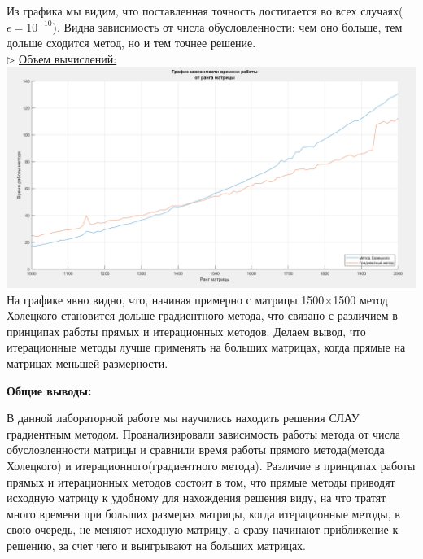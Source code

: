 \documentclass{article}
\begin{document}
	Из графика мы видим, что поставленная точность достигается во всех случаях($\epsilon = 10^{-10}$). Видна зависимость от числа обусловленности: чем оно больше, тем дольше сходится метод, но и тем точнее решение.\\
	$\triangleright$ \underline{Объем вычислений:}\\
	\includegraphics[scale = 0.4]{Время}\\
	На графике явно видно, что, начиная примерно с матрицы 1500$\times$1500 метод Холецкого становится дольше градиентного метода, что связано с различием в принципах работы прямых и итерационных методов. Делаем вывод, что итерационные методы лучше применять на больших матрицах, когда прямые на матрицах меньшей размерности.
	\newpage
	\begin{center} \textbf{Общие выводы:}\end{center}
	В данной лабораторной работе мы научились находить решения СЛАУ градиентным методом. Проанализировали зависимость работы метода от числа обусловленности матрицы и сравнили время работы прямого метода(метода Холецкого) и итерационного(градиентного метода). Различие в принципах работы прямых и итерационных методов состоит в том, что прямые методы приводят исходную матрицу к удобному для нахождения решения виду, на что тратят много времени при больших размерах матрицы, когда итерационные методы, в свою очередь, не меняют исходную матрицу, а сразу начинают приближение к решению, за счет чего и выигрывают на больших матрицах.
\end{document}
